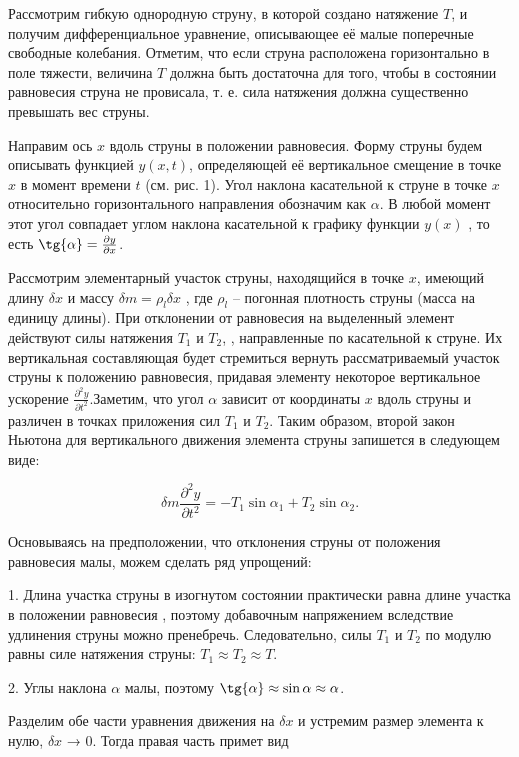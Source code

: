 \documentclass[a4paper,12pt]{article} %
\begin{document}
Рассмотрим гибкую однородную струну, в которой создано натяжение $T$,
и получим дифференциальное уравнение, описывающее её малые поперечные свободные колебания. Отметим, что если струна расположена горизонтально в поле тяжести, величина $T$ должна быть достаточна для того, чтобы в
состоянии равновесия струна не провисала, т. е. сила натяжения должна существенно превышать вес струны.

Направим ось $x$ вдоль струны в положении равновесия. Форму струны будем описывать функцией $y (x,t)$, определяющей её вертикальное смещение в
точке $x$ в момент времени $t$ (см. рис. 1). Угол наклона касательной к струне в
точке $x$ относительно горизонтального направления обозначим как $\alpha$. В любой момент этот угол совпадает углом наклона касательной к графику функции $y(x)$ , то есть $\tg{\alpha} = \frac{\partial y}{\partial x}$.

Рассмотрим элементарный участок струны, находящийся в точке $x$, имеющий длину $\delta x$ и массу $\delta m = \rho_l \delta x$ , где $\rho_l	$ -- погонная плотность струны
(масса на единицу длины). При отклонении от равновесия на выделенный
элемент действуют силы натяжения $T_1$ и $T_2$, , направленные по касательной к
струне. Их вертикальная составляющая будет стремиться вернуть рассматриваемый участок струны к положению равновесия, придавая элементу некоторое вертикальное ускорение $\frac{\partial^2{y}}{\partial{t^2}}$.Заметим, что угол $\alpha$ зависит от координаты
$x$ вдоль струны и различен в точках приложения сил $T_1$ и $T_2$. Таким образом,
второй закон Ньютона для вертикального движения элемента струны запишется в следующем виде: 

\[ \delta m\frac{\partial^2{y}}{\partial{t^2}} = -T_1\sin{\alpha_1} + T_2\sin{\alpha_2} .\]

Основываясь на предположении, что отклонения струны от положения
равновесия малы, можем сделать ряд упрощений:

1. Длина участка струны в изогнутом состоянии практически равна
длине участка в положении равновесия
, поэтому добавочным напряжением вследствие удлинения струны можно пренебречь. Следовательно, силы $T_1$ и $T_2$ по модулю равны силе натяжения струны: $T_1 \approx T_2 \approx T.$

2. Углы наклона $\alpha$ малы, поэтому $\tg{\alpha} \approx \sin{\alpha} \approx \alpha$.

Разделим обе части уравнения движения на $\delta x$ и устремим размер элемента к нулю, $\delta x$ → 0. Тогда правая часть примет вид
\end{document}
